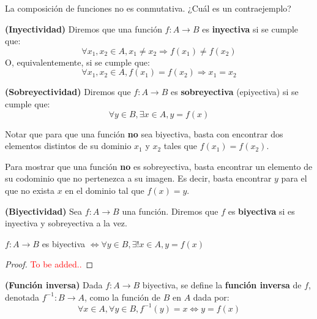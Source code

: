 \begin{nota}
	La composición de funciones no es conmutativa. ¿Cuál es un contraejemplo? 
\end{nota}

\begin{definicion}
	\textbf{(Inyectividad)}
	Diremos que una función $f: A \rightarrow B$ es \textbf{inyectiva} si se cumple que: 
	$$ \forall x_1, x_2 \in A , x_1 \neq x_2 \Longrightarrow f(x_1) \neq f(x_2) $$ 
	O, equivalentemente, si se cumple que: 
	$$ \forall x_1, x_2 \in A , f(x_1) = f(x_2) \Longrightarrow x_1 = x_2 $$ 
\end{definicion}

\begin{definicion}
	\textbf{(Sobreyectividad)}
	Diremos que $f: A \rightarrow B$ es \textbf{sobreyectiva} (epiyectiva) si se cumple que: 
	$$ \forall y \in B, \exists x \in A, y = f(x) $$ 
\end{definicion}

\begin{nota}
	 Notar que para que una función \textbf{no} sea biyectiva, basta con encontrar dos elementos distintos de su dominio $x_1$ y $x_2$ tales que $f(x_1) = f(x_2)$.
\end{nota}

\begin{nota}
	Para mostrar que una función \textbf{no} es sobreyectiva, basta encontrar un elemento de su codominio que no pertenezca a su imagen. Es decir, basta encontrar $y$ para el que no exista $x$ en el dominio tal que $f(x) = y$. 
\end{nota}

\begin{definicion}
	\textbf{(Biyectividad)}
	Sea $f: A \rightarrow B$ una función. Diremos que $f$ es \textbf{biyectiva} si es inyectiva y sobreyectiva a la vez. 
\end{definicion}

\begin{proposicion}
	$f: A \rightarrow B$ es biyectiva $\iff \forall y \in B, \exists! x \in A, y = f(x)$
\end{proposicion}

\begin{proof}
	\textcolor{red}{To be added..}
\end{proof}

\begin{definicion}
	\textbf{(Función inversa)}
	Dada $f : A \rightarrow B$ biyectiva, se define la \textbf{función inversa} de $f$, denotada $f^{-1}: B \rightarrow A$, como la función de $B$ en $A$ dada por: 
	$$ \forall x \in A, \forall y \in B, f^{-1}(y) = x \iff y = f(x) $$ 
\end{definicion}


